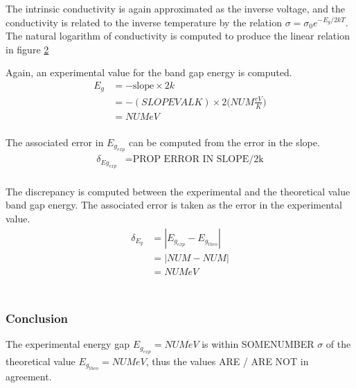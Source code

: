 \documentclass[a4paper]{article}
\begin{document}
\begin{figure}[H]
\centering
\label{task33plot}
\end{figure}

The intrinsic conductivity is again approximated as the inverse voltage, and the conductivity is related to the inverse temperature by the relation $\sigma = \sigma_0 e^{-E_g/2kT}$. The natural logarithm of conductivity is computed to produce the linear relation in figure \ref{task33plotLINEAR}

\begin{figure}[H]
\centering
\label{task33plotLINEAR}
\end{figure}

Again, an experimental value for the band gap energy is computed.
\begin{align*}
E_g &= - \text{slope} \times 2k \\
    &= - (SLOPEVAL K) \times 2 
       \Big( NUM \frac{eV}{K} \Big) \\
    &= NUM eV \\
\end{align*}

The associated error in $E_{g_{exp}}$ can be computed from the error in the slope.
\begin{align*}
\delta_{Eg_{exp}} &= \text{PROP ERROR IN SLOPE/2k} \\
\end{align*}

The discrepancy is computed between the experimental and the theoretical value band gap energy. The associated error is taken as the error in the experimental value.
\begin{align*}
\delta_{E_g} &= | E_{g_{exp}} - E_{g_{theo}} | \\
		     &= | NUM - NUM| \\
		     &= NUM eV \\
\end{align*}\\

\subsubsection{Conclusion}
The experimental energy gap $E_{g_{exp}} = NUM eV$ is within SOMENUMBER $\sigma$ of the theoretical value $E_{g_{theo}} = NUM eV$, thus the values  ARE / ARE NOT in agreement.
\end{document}
